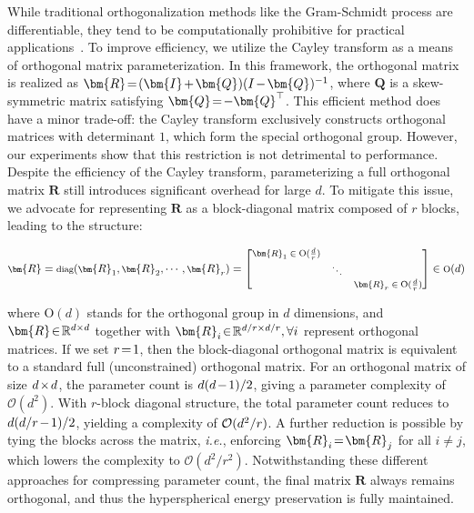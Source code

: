 {While traditional orthogonalization methods like the Gram-Schmidt process are differentiable, they tend to be computationally prohibitive for practical applications~\cite{liu2021orthogonal}. To improve efficiency, we utilize the Cayley transform as a means of orthogonal matrix parameterization. In this framework, the orthogonal matrix is realized as $\thickmuskip=2mu \medmuskip=2mu \bm{R}=(\bm{I}+\bm{Q})(I-\bm{Q})^{-1}$, where $\bm{Q}$ is a skew-symmetric matrix satisfying $\thickmuskip=2mu \medmuskip=2mu \bm{Q}=-\bm{Q}^\top$. This efficient method does have a minor trade-off: the Cayley transform exclusively constructs orthogonal matrices with determinant $1$, which form the special orthogonal group. However, our experiments show that this restriction is not detrimental to performance. Despite the efficiency of the Cayley transform, parameterizing a full orthogonal matrix $\bm{R}$ still introduces significant overhead for large $d$. To mitigate this issue, we advocate for representing $\bm{R}$ as a block-diagonal matrix composed of $r$ blocks, leading to the structure:

\begin{equation}
    \footnotesize
    \bm{R}=\text{diag}(\bm{R}_1,\bm{R}_2,\cdots,\bm{R}_r)=\begin{bmatrix}
    \bm{R}_1\in \text{O}(\frac{d}{r}) &  &\\
    &\ddots & \\
    & & \bm{R}_r\in \text{O}(\frac{d}{r})
    \end{bmatrix}\in \text{O}(d)
\end{equation}

where $\text{O}(d)$ stands for the orthogonal group in $d$ dimensions, and $\thickmuskip=2mu \medmuskip=2mu \bm{R}\in\mathbb{R}^{d\times d}$ together with $\thickmuskip=2mu \medmuskip=2mu \bm{R}_i\in\mathbb{R}^{d/r\times d/r},\forall i$ represent orthogonal matrices. If we set $\thickmuskip=2mu \medmuskip=2mu r=1$, then the block-diagonal orthogonal matrix is equivalent to a standard full (unconstrained) orthogonal matrix. For an orthogonal matrix of size $\thickmuskip=2mu \medmuskip=2mu d\times d$, the parameter count is $\thickmuskip=2mu \medmuskip=2mu d(d-1)/2$, giving a parameter complexity of $\mathcal{O}(d^2)$. With $r$-block diagonal structure, the total parameter count reduces to $\thickmuskip=2mu \medmuskip=2mu d(d/r-1)/2$, yielding a complexity of $\thickmuskip=2mu \medmuskip=2mu \mathcal{O}(d^2/r)$. A further reduction is possible by tying the blocks across the matrix, \emph{i.e.}, enforcing $\thickmuskip=2mu \medmuskip=2mu\bm{R}_i=\bm{R}_j$ for all $i\neq j$, which lowers the complexity to $\mathcal{O}(d^2/r^2)$. Notwithstanding these different approaches for compressing parameter count, the final matrix $\bm{R}$ always remains orthogonal, and thus the hyperspherical energy preservation is fully maintained.

}

